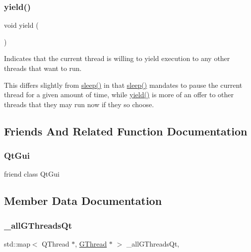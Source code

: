 \subsubsection{\texorpdfstring{yield()}{yield()}}
{\footnotesize\ttfamily void yield (\begin{DoxyParamCaption}{ }\end{DoxyParamCaption})\hspace{0.3cm}{\ttfamily [pure virtual]}}



Indicates that the current thread is willing to yield execution to any other threads that want to run. 

This differs slightly from \mbox{\hyperlink{classsgl_1_1GThread_aa766a832061596446daffb891f42b71d}{sleep()}} in that \mbox{\hyperlink{classsgl_1_1GThread_aa766a832061596446daffb891f42b71d}{sleep()}} mandates to pause the current thread for a given amount of time, while \mbox{\hyperlink{classsgl_1_1GThread_a77a5c1943920f355bd1db8cb99bddcfc}{yield()}} is more of an offer to other threads that they may run now if they so choose. 

\subsection{Friends And Related Function Documentation}
\mbox{\label{classsgl_1_1GThread_a78e6068a40352424a09cd3753706c619}} 
\subsubsection{\texorpdfstring{Qt\+Gui}{QtGui}}
{\footnotesize\ttfamily friend class Qt\+Gui\hspace{0.3cm}{\ttfamily [friend]}}



\subsection{Member Data Documentation}
\mbox{\label{classsgl_1_1GThread_a70101b45edebc3c3a381ba4e52aca4f7}} 
\subsubsection{\texorpdfstring{\+\_\+all\+G\+Threads\+Qt}{\_allGThreadsQt}}
{\footnotesize\ttfamily std\+::map$<$ Q\+Thread $\ast$, \mbox{\hyperlink{classsgl_1_1GThread}{G\+Thread}} $\ast$ $>$ \+\_\+all\+G\+Threads\+Qt\hspace{0.3cm}{\ttfamily [static]}, {\ttfamily [protected]}}

